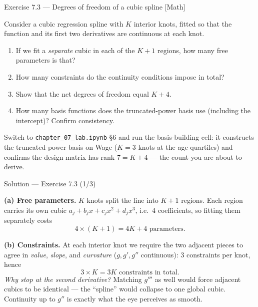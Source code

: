 \documentclass[aspectratio=169,11pt]{beamer}
\begin{document}
\begin{frame}{Exercise 7.3 --- Degrees of freedom of a cubic spline [Math]}
\begin{exercise}
Consider a cubic regression spline with $K$ interior knots, fitted so that the function and its first two derivatives are continuous at each knot.
\begin{enumerate}
  \item If we fit a \emph{separate} cubic in each of the $K+1$ regions, how many free parameters is that?
  \item How many constraints do the continuity conditions impose in total?
  \item Show that the net degrees of freedom equal $K+4$.
  \item How many basis functions does the truncated-power basis use (including the intercept)? Confirm consistency.
\end{enumerate}
\end{exercise}
\begin{labnote}
  Switch to \texttt{chapter\_07\_lab.ipynb} \S6 and run the basis-building cell: it constructs the truncated-power basis on Wage ($K=3$ knots at the age quartiles) and confirms the design matrix has rank $7=K+4$ --- the count you are about to derive.
\end{labnote}
\end{frame}

\begin{frame}{Solution --- Exercise 7.3 (1/3)}
\begin{solutionbox}
\textbf{(a) Free parameters.} $K$ knots split the line into $K+1$ regions. Each region carries its own cubic $a_j+b_jx+c_jx^2+d_jx^3$, i.e.\ $4$ coefficients, so fitting them separately costs
\[ 4\times(K+1)=4K+4 \text{ parameters.} \]

\medskip
\textbf{(b) Constraints.} At each interior knot we require the two adjacent pieces to agree in \emph{value}, \emph{slope}, and \emph{curvature} ($g,g',g''$ continuous): $3$ constraints per knot, hence
\[ 3\times K = 3K \text{ constraints in total.} \]
\emph{Why stop at the second derivative?} Matching $g'''$ as well would force adjacent cubics to be identical --- the ``spline'' would collapse to one global cubic. Continuity up to $g''$ is exactly what the eye perceives as smooth.
\end{solutionbox}
\end{frame}
\end{document}
